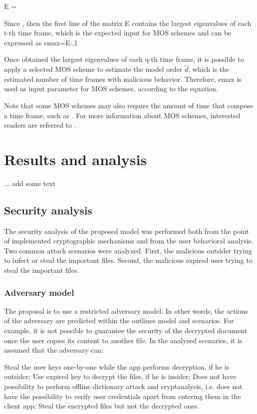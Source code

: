 \documentclass[twocolumn]{svjour3}          %
\begin{document}
E =                                                                                             

Since   , then the first line of the matrix E contains the largest eigenvalues of each t-th time frame, which is the expected input for MOS schemes and can be expressed as 
emax=E{:,1}

Once obtained the largest eigenvalues of each q-th time frame, it is possible to apply a selected MOS scheme to estimate the model order $\hat{d}$, which is the estimated number of time frames with malicious behavior. Therefore, emax is used as input parameter for MOS schemes, according to the equation.

Note that some MOS schemes may also require the amount of time that compose a time frame, such as . For more information about MOS schemes, interested readers are referred to \cite{da2009comparison}.

\section{Results and analysis}
\label{sec_results}

... add some text

\subsection{Security analysis}
\label{sec_sec_analysis}
The security analysis of the proposed model was performed both from the point of implemented cryptographic mechanisms and from the user behavioral analysis. Two common attack scenarios were analyzed. First, the malicious outsider trying to infect or steal the important files. Second, the malicious expired user trying to steal the important files. 

\subsubsection{Adversary model}
\label{sec_adversary_model}
The proposal is to use a restricted adversary model. In other words, the actions of the adversary are predicted within the outlines model and scenarios. For example, it is not possible to guarantee the security of the decrypted document once the user copies its content to another file. In the analyzed scenarios, it is assumed that the adversary can:

Steal the user keys one-by-one while the app performs decryption, if he is outsider;
Use expired key to decrypt the files, if he is insider;
Does not have possibility to perform offline dictionary attack and cryptanalysis, i.e. does not have the possibility to verify user credentials apart from entering them in the client app;
Steal the encrypted files but not the decrypted ones.
\end{document}

